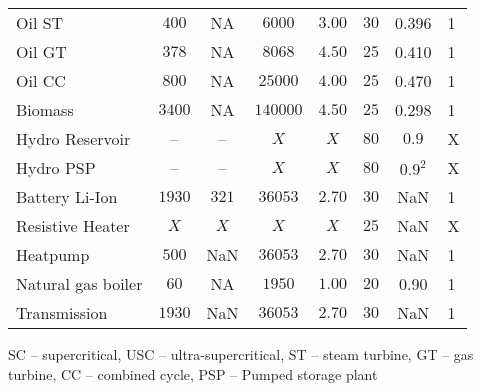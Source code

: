 \documentclass[review, 3p, times]{elsarticle} %
\begin{document}
\begin{table*}[h!t]
\begin{threeparttable}
\begin{tabulary}{0.5\textwidth}{lccccccl}
                Oil ST & $400$     & NA & $6000$    & $3.00$     & $30$ & 0.396 & 1 \\
                Oil GT & $378$     & NA & $8068$    & $4.50$     & $25$ & 0.410 & 1 \\
                Oil CC & $800$     & NA & $25000$   & $4.00$     & $25$ & 0.470 & 1 \\
                Biomass & $3400$    & NA & $140000$  & $4.50$     & $25$ & 0.298 & 1 \\ \midrule
                Hydro Reservoir & -- & -- & $X$       & $X$       & $80$ & $0.9$  & X \\
                Hydro PSP & -- & -- & $X$       & $X$       & $80$ & $0.9^2$ & X\\
                Battery Li-Ion & $1930$    & $321$ & $36053$   & $2.70$    & $30$ & NaN & 1 \\ \midrule
                Resistive Heater & $X$      & $X$   & $X$       & $X$       & $25$  & NaN & X \\
                Heatpump & $500$     & NaN & $36053$   & $2.70$    & $30$ & NaN & 1 \\
                Natural gas boiler & $60$   & NA & $1950$    & $1.00$    & $20$ & 0.90 & 1 \\ \midrule
                Transmission & $1930$    & NaN & $36053$   & $2.70$    & $30$ & NaN & 1 \\
                \bottomrule
            \end{tabulary}

            \begin{tablenotes}
                \item SC -- supercritical, USC -- ultra-supercritical, ST -- steam turbine, GT -- gas turbine,
                CC -- combined cycle, PSP -- Pumped storage plant
            \end{tablenotes}

        \end{threeparttable}
    \end{table*}
\end{document}
